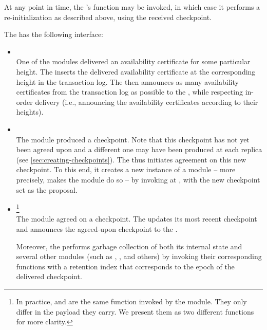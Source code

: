 \documentclass{article}
\begin{document}
At any point in time, the 's \invoke{RestoreFromCheckpoint(checkpoint])} function may be invoked,
in which case it performs a re-initialization as described above, using the received checkpoint.

The  has the following interface:
\begin{itemize}

    \item {}\\
    One of the  modules delivered an availability certificate for some particular height.
    The  inserts the delivered availability certificate
    at the corresponding height in the transaction log.
    The  then announces as many availability certificates from the transaction log as possible
    to the , while respecting in-order delivery
    (i.e., announcing the availability certificates according to their heights).

    \item {}\\
    The  module produced a checkpoint.
    Note that this checkpoint has not yet been agreed upon and a different one may have been produced at each replica (see \cref{sec:creating-checkpoints}).
    The  thus initiates agreement on this new checkpoint.
    To this end, it creates a new instance of a  module -- more precisely,
    makes the  module do so -- by invoking  at ,
    with the new checkpoint set as the proposal.

    \item {}\footnote{
        In practice,  and  are the same function invoked by the  module.
        They only differ in the payload they carry.
        We present them as two different functions for more clarity.
    }\\
    The  module agreed on a checkpoint.
    The  updates its most recent checkpoint
    and announces the agreed-upon checkpoint to the .

    Moreover, the  performs garbage collection of both its internal state
    and several other modules (such as , , and others)
    by invoking their corresponding  functions with a retention index
    that corresponds to the epoch of the delivered checkpoint.


\end{itemize}
\end{document}
